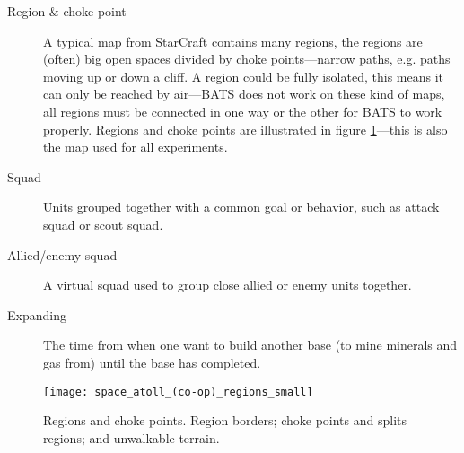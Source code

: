 \begin{description}
	\item[Region \& choke point] A typical map from StarCraft contains many regions, the regions are (often) big open spaces divided by choke points—narrow paths, e.g. paths moving up or down a cliff. A region could be fully isolated, this means it can only be reached by air—BATS does not work on these kind of maps, all regions must be connected in one way or the other for BATS to work properly. Regions and choke points are illustrated in figure \ref{fig:region_and_choke_points}—this is also the map used for all experiments.
	\item[Squad] Units grouped together with a common goal or behavior, such as attack squad or scout squad.
	\item[Allied/enemy squad] A virtual squad used to group close allied or enemy units together.
	\item[Expanding] The time from when one want to build another base (to mine minerals and gas from) until the base has completed.
\end{description}
\begin{figure}[htb]
	\centering
	\texttt{[image: space\_atoll\_(co-op)\_regions\_small]}
	\caption[Regions and choke points]{
		Regions and choke points.
		\usebox{\LegendLineLightGreen} Region borders;
		\usebox{\LegendLineRed} choke points and splits regions; and
		\usebox{\LegendBoxYellow} unwalkable terrain.}
	\label{fig:region_and_choke_points}
\end{figure}
